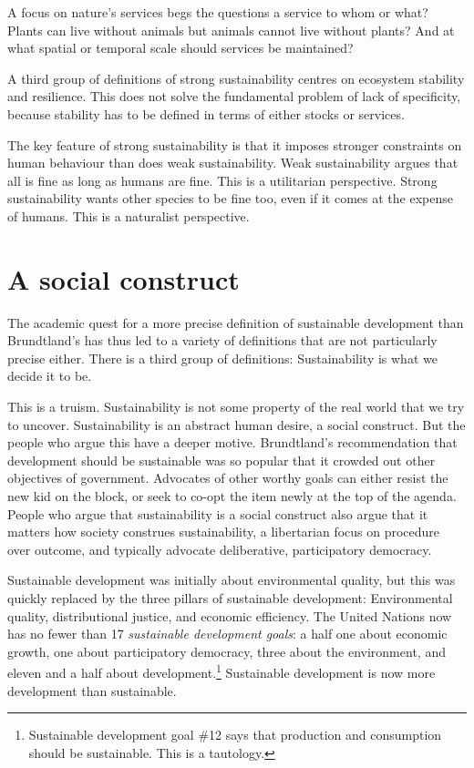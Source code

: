 A focus on nature's services begs the questions a service to whom or what? Plants can live without animals but animals cannot live without plants? And at what spatial or temporal scale should services be maintained? 

A third group of definitions of strong sustainability centres on ecosystem stability and resilience. This does not solve the fundamental problem of lack of specificity, because stability has to be defined in terms of either stocks or services.

The key feature of strong sustainability is that it imposes stronger constraints on human behaviour than does weak sustainability. Weak sustainability argues that all is fine as long as humans are fine. This is a utilitarian perspective. Strong sustainability wants other species to be fine too, even if it comes at the expense of humans. This is a naturalist perspective.

\section{A social construct}
The academic quest for a more precise definition of sustainable development than Brundtland's has thus led to a variety of definitions that are not particularly precise either. There is a third group of definitions: Sustainability is what we decide it to be.

This is a truism. Sustainability is not some property of the real world that we try to uncover. Sustainability is an abstract human desire, a social construct. But the people who argue this have a deeper motive. Brundtland's recommendation that development should be sustainable was so popular that it crowded out other objectives of government. Advocates of other worthy goals can either resist the new kid on the block, or seek to co-opt the item newly at the top of the agenda. People who argue that sustainability is a social construct also argue that it matters how society construes sustainability, a libertarian focus on procedure over outcome, and typically advocate deliberative, participatory democracy.

Sustainable development was initially about environmental quality, but this was quickly replaced by the three pillars of sustainable development: Environmental quality, distributional justice, and economic efficiency. The United Nations now has no fewer than 17 \emph{sustainable development goals}: a half one about economic growth, one about participatory democracy, three about the environment, and eleven and a half about development.\footnote{Sustainable development goal \#12 says that production and consumption should be sustainable. This is a tautology.} Sustainable development is now more development than sustainable.

